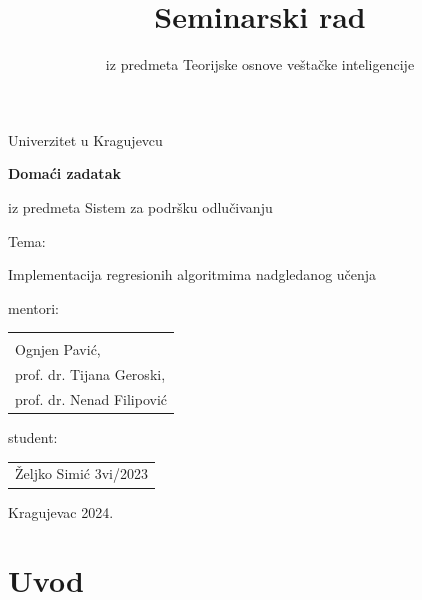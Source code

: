 \documentclass[fontsize=12bp, paper=a4]{scrarticle}
\title{Seminarski rad}
\subtitle{iz predmeta Teorijske osnove veštačke inteligencije}
\begin{document}
\begin{titlepage}
    
    \begin{center}
        
        \vspace*{8cm}
        
        \large{Univerzitet u Kragujevcu}
        
        \vspace*{1cm}

        {\bfseries \LARGE Domaći zadatak}
        
        \large{iz predmeta Sistem za podršku odlučivanju}
        
        \vspace*{1cm}
        \large{Tema:}

        \Large{Implementacija regresionih algoritmima nadgledanog učenja}


        \vspace*{2cm}
    \end{center}
    \hfill{\parbox[s]{8cm}{

    mentori: 
    \begin{tabular}{l}
        \\
        \\
        Ognjen Pavić, \\
        prof. dr. Tijana Geroski, \\
        prof. dr. Nenad Filipović 
    \end{tabular}
    
    student: \begin{tabular}{l}
        Željko Simić 3vi/2023
    \end{tabular}
    }}

    \hspace*{\fill} 

    \vspace*{2cm}

    \begin{center}
        Kragujevac 2024.
    \end{center}
\end{titlepage}


\setcounter{page}{1}
\justifying
\linespread{0.9}
\cfoot[\pagemark]{\pagemark}
\ofoot[]{}
\chead[]{}
%
\justifying

\section{Uvod}
\end{document}
